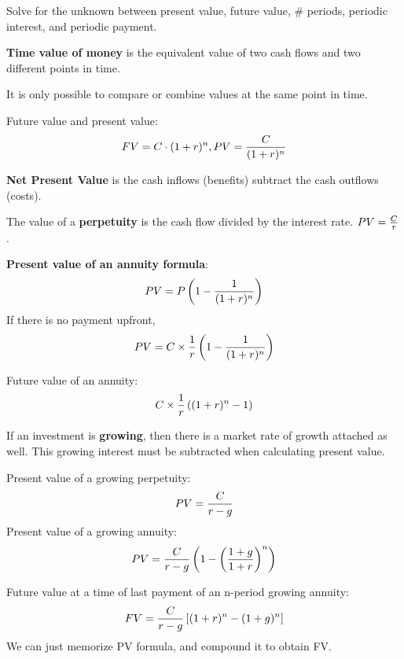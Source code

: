 \documentclass[english, 12pt]{article}
\begin{document}
\begin{qte}
Solve for the unknown between present value, future value, \# periods, periodic interest, and periodic payment.
\end{qte}
\begin{defn}
\textbf{Time value of money} is the equivalent value of two cash flows and two different points in time.
\end{defn}
\begin{qte}
It is only possible to compare or combine values at the same point in time.
\end{qte}
\begin{thrm}
Future value and present value:
\[FV = C \cdot (1+r)^n, PV = \frac{C}{(1+r)^n}\]
\end{thrm}

\begin{defn}
\textbf{Net Present Value} is the cash inflows (benefits) subtract the cash outflows (costs).
\end{defn}

\begin{defn}
The value of a \textbf{perpetuity} is the cash flow divided by the interest rate. $PV = \frac{C}{r}$.
\end{defn}

\begin{thrm}
\textbf{Present value of an annuity formula}:
\[PV=P\left(1-\frac{1}{(1+r)^n}\right)\]
If there is no payment upfront,
\[PV = C \times \frac{1}{r} \left(1-\frac{1}{(1+r)^n}\right)\]
\end{thrm}
\begin{thrm}
Future value of an annuity:
\[C \times \frac{1}{r} \left((1+r)^n - 1\right)\]
\end{thrm}

\begin{defn}
If an investment is \textbf{growing}, then there is a market rate of growth attached as well. This growing interest must be subtracted when calculating present value.
\end{defn}

\begin{thrm}
Present value of a growing perpetuity:
\[PV = \frac{C}{r-g}\]
Present value of a growing annuity:
\[PV = \frac{C}{r-g} \left(1 - \left(\frac{1+g}{1+r}\right)^n\right)\]
\end{thrm}
\begin{defn}
Future value at a time of last payment of an n-period growing annuity:
\[ FV = \frac{C}{r-g} \left\lbrack (1+r)^n - (1+g)^n\right\rbrack\]
We can just memorize PV formula, and compound it to obtain FV.
\end{defn}
\end{document}
